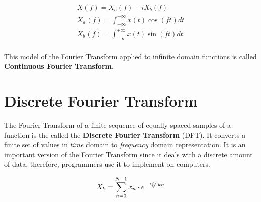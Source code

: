 \documentclass[
  oneside,
  11pt, a4paper,
  footinclude=true,
  headinclude=true,
  cleardoublepage=empty
]{scrbook}
\newcommand{\eqname}[1]{\tag*{#1}}%
\begin{document}
\begin{equation}
    \begin{split}
        X(f) = X_{a}(f) + i X_{b}(f) \\
        X_{a}(f) = \int_{-\infty}^{+\infty} x(t) \cos (f t) dt \\
        X_{b}(f) = \int_{-\infty}^{+\infty} x(t) \sin (f t) dt \\
    \end{split}
\end{equation}




This model of the Fourier Transform applied to infinite domain functions is called \textbf{Continuous Fourier Transform}. %




\section{Discrete Fourier Transform} \label{sec:discrete-fourier-transform}


The Fourier Transform of a finite sequence of equally-spaced samples of a function is the called the \textbf{Discrete Fourier Transform} (DFT). It converts a finite set of values in \textit{time} domain to \textit{frequency} domain representation. It is an important version of the Fourier Transform since it deals with a discrete amount of data, therefore, programmers use it to implement on computers.

\begin{equation} \label{eq:forward-discrete-fourier-transform}
    X_{k} = \sum_{n=0}^{N-1}x_{n} \cdot e^{- \frac{i 2 \pi}{N}kn} \\ %
\end{equation}
\end{document}

